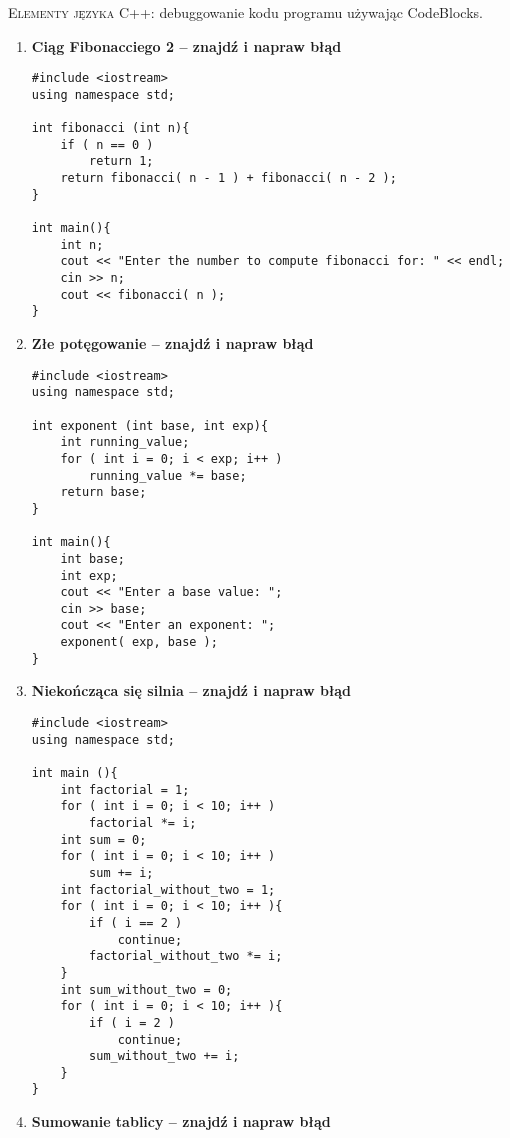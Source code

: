 \documentclass[12pt]{article}
\begin{document}
\small \textsc{Elementy języka C++:} debuggowanie kodu programu używając CodeBlocks.

\begin{enumerate}

\item \textbf{Ciąg Fibonacciego 2 -- znajdź i napraw błąd}\\

\begin{Verbatim}[fontsize=\tiny]
#include <iostream>
using namespace std;

int fibonacci (int n){
	if ( n == 0 )
		return 1;
	return fibonacci( n - 1 ) + fibonacci( n - 2 );
}

int main(){
	int n;
	cout << "Enter the number to compute fibonacci for: " << endl;
	cin >> n;
	cout << fibonacci( n );
}
\end{Verbatim}

\item \textbf{Złe potęgowanie -- znajdź i napraw błąd}\\

\begin{Verbatim}[fontsize=\tiny]
#include <iostream>
using namespace std;

int exponent (int base, int exp){
	int running_value;
	for ( int i = 0; i < exp; i++ )
		running_value *= base;
	return base;
}

int main(){
	int base;
	int exp;
	cout << "Enter a base value: ";
	cin >> base;
	cout << "Enter an exponent: ";
	exponent( exp, base );
}
\end{Verbatim}

\item \textbf{Niekończąca się silnia  -- znajdź i napraw błąd}\\

\begin{Verbatim}[fontsize=\tiny]
#include <iostream>
using namespace std;

int main (){
	int factorial = 1;
	for ( int i = 0; i < 10; i++ )
		factorial *= i;
	int sum = 0;
	for ( int i = 0; i < 10; i++ )
		sum += i;
	int factorial_without_two = 1;
	for ( int i = 0; i < 10; i++ ){
		if ( i == 2 )
			continue;
		factorial_without_two *= i;
	}
	int sum_without_two = 0;
	for ( int i = 0; i < 10; i++ ){
		if ( i = 2 )
			continue;
		sum_without_two += i;
	}
} 
\end{Verbatim}

\item \textbf{Sumowanie tablicy  -- znajdź i napraw błąd}\\


\end{enumerate}
\end{document}
